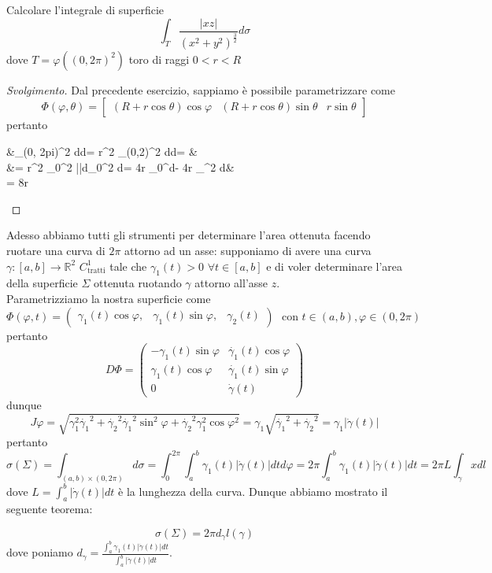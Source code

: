 \begin{exercise}
	Calcolare l'integrale di superficie
	$$
	\int_T \frac{|xz|}{(x^2 + y^2)^{\frac{3}{2}}} d\sigma
	$$
	dove $T=\varphi((0, 2\pi)^2)$ toro di raggi $0 < r < R$
	
\end{exercise}
\begin{proof}[Svolgimento]
Dal precedente esercizio, sappiamo è possibile parametrizzare come
	$$
	\Phi(\varphi, \theta) = \begin{bmatrix}	(R + r\cos{\theta})\cos{\varphi} & (R + r\cos{\theta})\sin{\theta} & r \sin{\theta}	\end{bmatrix}
	$$
	pertanto
	\begin{flalign*}
	&\int_{(0, 2pi)^2} d\varphi d\theta = r^2 \int_{(0,2\pi)^2}  d\varphi d\theta = & \\
	&= r^2 \int_0^{2\pi} |\cos{\varphi}|d\varphi \int_0^{2 \pi}  d\theta = 4r \int_0^\pi {}d\theta - 4r \int_\pi^{2\pi} d\theta & \\
	= 8r
	\end{flalign*}
\end{proof}
Adesso abbiamo tutti gli strumenti per determinare l'area ottenuta facendo ruotare una curva di $2\pi$ attorno ad un asse: supponiamo di avere una curva $\gamma: [a, b] \to \mathbb{R}^2$ $C^1_\text{tratti}$ tale che $\gamma_1(t) > 0 \, \, \forall t \in [a, b]$ e di voler
determinare l'area della superficie $\Sigma$ ottenuta ruotando $\gamma$ attorno all'asse $z$. \\
Parametrizziamo la nostra superficie come
$$
\Phi(\varphi, t) = \begin{pmatrix}
	\gamma_1(t) \cos{\varphi}, & \gamma_1(t) \sin{\varphi}, & \gamma_2(t)
\end{pmatrix} \, \, \text{ con } t \in (a, b), \varphi \in (0, 2\pi) 
$$
pertanto
$$
D\Phi = \begin{pmatrix}
-\gamma_1(t)\sin{\varphi} & \dot{\gamma_1}(t)\cos{\varphi} \\
\gamma_1(t)\cos{\varphi} & \dot{\gamma_1}(t)\sin{\varphi} \\
0 & \dot{\gamma}(t)
\end{pmatrix}
$$
dunque
$$
J\varphi = \sqrt{\gamma_1^2 \dot{\gamma_1}^2 + \dot{\gamma_2}^2 \dot{\gamma_1}^2 \sin^2{\varphi} + \dot{\gamma_2}^2 \gamma_1^2 \cos{\varphi}^2} = \gamma_1\sqrt{\dot{\gamma_1}^2 + \dot{\gamma_2}^2} = \gamma_1 |\dot{\gamma}(t)|
$$
pertanto
$$
\sigma(\Sigma) = \int_{(a, b) \times (0, 2\pi)} d\sigma = \int_{0}^{2\pi} \int_a^b \gamma_1(t) |\dot{\gamma}(t)|dt d\varphi = 2 \pi \int_a^b \gamma_1(t) |\dot{\gamma}(t)|dt = 2 \pi L \int_\gamma x dl
$$
dove $L=\int_a^b |\dot{\gamma}(t)|dt$ è la lunghezza della curva. Dunque abbiamo mostrato il seguente teorema:
\begin{theorem}
$$
\sigma(\Sigma) = 2\pi d_\gamma l(\gamma)
$$
dove poniamo $d_\gamma = \frac{\int_a^b \gamma_1(t) |\dot{\gamma}(t)|dt}{\int_a^b |\dot{\gamma}(t)|dt}$.
\end{theorem}
